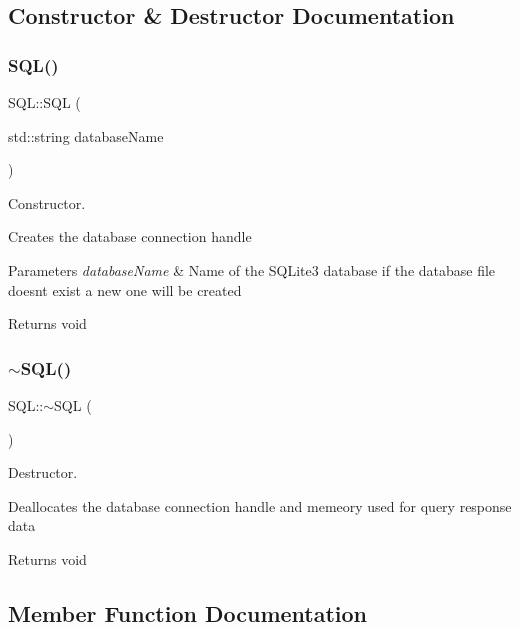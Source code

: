 \subsection{Constructor \& Destructor Documentation}
\mbox{\label{class_s_q_l_a7c4e2325de3976159cabc406ad8c962d}} 
\subsubsection{\texorpdfstring{S\+Q\+L()}{SQL()}}
{\footnotesize\ttfamily S\+Q\+L\+::\+S\+QL (\begin{DoxyParamCaption}\item[{std\+::string}]{database\+Name }\end{DoxyParamCaption})}



Constructor. 

Creates the database connection handle 
\begin{DoxyParams}{Parameters}
{\em database\+Name} & Name of the S\+Q\+Lite3 database if the database file doesn\textquotesingle{}t exist a new one will be created \\
\hline
\end{DoxyParams}
\begin{DoxyReturn}{Returns}
{\ttfamily void} 
\end{DoxyReturn}
\mbox{\label{class_s_q_l_a1c65a40213ae07fdd8f25bd292b2a68c}} 
\subsubsection{\texorpdfstring{$\sim$\+S\+Q\+L()}{~SQL()}}
{\footnotesize\ttfamily S\+Q\+L\+::$\sim$\+S\+QL (\begin{DoxyParamCaption}{ }\end{DoxyParamCaption})}



Destructor. 

Deallocates the database connection handle and memeory used for query response data \begin{DoxyReturn}{Returns}
{\ttfamily void} 
\end{DoxyReturn}


\subsection{Member Function Documentation}
\mbox{\label{class_s_q_l_a34c269413c9323a7249c821740c5fb36}} 
